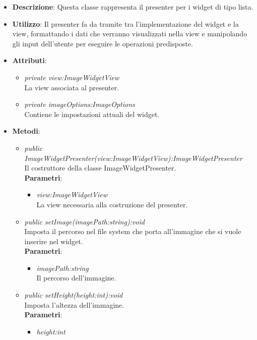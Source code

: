 \begin{itemize}
\item \textbf{Descrizione}: Questa classe rappresenta il presenter per i widget di tipo lista.
\item \textbf{Utilizzo}: Il presenter fa da tramite tra l'implementazione del widget e la view, formattando i dati che verranno visualizzati nella view e manipolando gli input dell'utente per eseguire le operazioni predisposte.
\item \textbf{Attributi}:
	\begin{itemize}
	\item \textit{private view:ImageWidgetView}\\
	La view associata al presenter.
	\item \textit{private imageOptions:ImageOptions}\\
	Contiene le impostazioni attuali del widget.
	\end{itemize}
\item \textbf{Metodi}:
	\begin{itemize}
	\item \textit{public ImageWidgetPresenter(view:ImageWidgetView):ImageWidgetPresenter}\\
	Il costruttore della classe ImageWidgetPresenter.
		\\ \textbf{Parametri}: \begin{itemize}
		\item \textit{view:ImageWidgetView}\\
		La view necessaria alla costruzione del presenter.
		\end{itemize}
	\item \textit{public setImage(imagePath:string):void}\\
	Imposta il percorso nel file system che porta all'immagine che si vuole inserire nel widget.
		\\ \textbf{Parametri}: \begin{itemize}
		\item \textit{imagePath:string}\\
		Il percorso dell'immagine.
		\end{itemize} 
	\item \textit{public setHeight(height:int):void}\\
	Imposta l'altezza dell'immagine.
		\\ \textbf{Parametri}: \begin{itemize}
		\item \textit{height:int}\\

\end{itemize}
\end{itemize}
\end{itemize}
